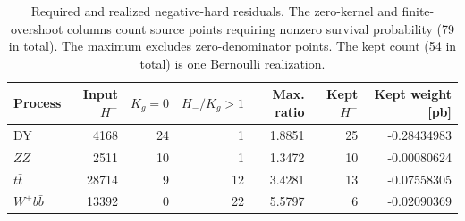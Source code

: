 \begin{table}[t]
\centering\small
\setlength{\tabcolsep}{5pt}
\begin{tabular}{lrrrrrr}
\toprule
Process & Input $H^-$ & $K_g=0$ & $H_-/K_g>1$ & Max. ratio & Kept $H^-$ & Kept weight [pb]\\
\midrule
DY & 4168 & 24 & 1 & 1.8851 & 25 & -0.28434983\\
$ZZ$ & 2511 & 10 & 1 & 1.3472 & 10 & -0.00080624\\
$t\bar t$ & 28714 & 9 & 12 & 3.4281 & 13 & -0.07558305\\
$W^+b\bar b$ & 13392 & 0 & 22 & 5.5797 & 6 & -0.02090369\\
\bottomrule
\end{tabular}
\caption{Required and realized negative-hard residuals. The zero-kernel and finite-overshoot columns count source points requiring nonzero survival probability (79 in total). The maximum excludes zero-denominator points. The kept count (54 in total) is one Bernoulli realization.}
\label{tab:residuals}
\end{table}
